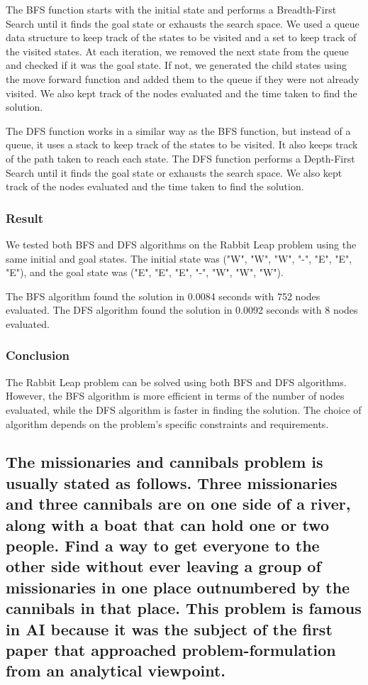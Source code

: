 \documentclass[15pt,journal]{IEEEtran}
\begin{document}
The BFS function starts with the initial state and performs a Breadth-First Search until it finds the goal state or exhausts the search space. We used a queue data structure to keep track of the states to be visited and a set to keep track of the visited states. At each iteration, we removed the next state from the queue and checked if it was the goal state. If not, we generated the child states using the move forward function and added them to the queue if they were not already visited. We also kept track of the nodes evaluated and the time taken to find the solution.

The DFS function works in a similar way as the BFS function, but instead of a queue, it uses a stack to keep track of the states to be visited. It also keeps track of the path taken to reach each state. The DFS function performs a Depth-First Search until it finds the goal state or exhausts the search space. We also kept track of the nodes evaluated and the time taken to find the solution.\\
\subsubsection{\large{Result}\\}
We tested both BFS and DFS algorithms on the Rabbit Leap problem using the same initial and goal states. The initial state was ("W", "W", "W", "-", "E", "E", "E"), and the goal state was ("E", "E", "E", "-", "W", "W", "W").

The BFS algorithm found the solution in 0.0084 seconds with 752 nodes evaluated. The DFS algorithm found the solution in 0.0092 seconds with 8 nodes evaluated.\\
\subsubsection{\large{Conclusion}\\}
The Rabbit Leap problem can be solved using both BFS and DFS algorithms. However, the BFS algorithm is more efficient in terms of the number of nodes evaluated, while the DFS algorithm is faster in finding the solution. The choice of algorithm depends on the problem's specific constraints and requirements.
\subsection{The missionaries and cannibals problem is usually stated as follows. Three missionaries and three cannibals are on one side of a river, along with a boat that can hold one or two people. Find a way to get everyone to the other side without ever leaving a group of missionaries in one place outnumbered by the cannibals in that place. This problem is famous in AI because it was the subject of the first paper that approached problem-formulation from an analytical viewpoint. 
}
\end{document}
